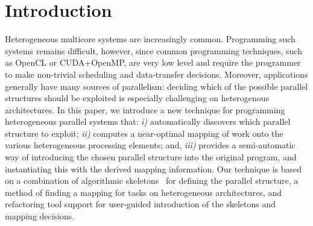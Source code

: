 \documentclass[smallextended]{svjour3}
\begin{document}
\section{Introduction}
\noindent
Heterogeneous multicore systems are increasingly common.
Programming such systems remains difficult, however, since
common programming techniques, such as OpenCL or CUDA+OpenMP,
are very low level and 
require the programmer to make non-trivial scheduling and data-transfer decisions.
Moreover, applications generally have many sources of parallelism: deciding
which of the possible parallel structures should be exploited is especially challenging on heterogenous architectures.
%
In this paper, we introduce a new technique for programming heterogeneous parallel systems
that: \emph{i)} automatically discovers which parallel structure to exploit; \emph{ii)} computes a near-optimal mapping of work onto
the various heterogeneous processing elements; and, \emph{iii)} provides a semi-automatic way of
introducing the chosen parallel structure into the original program, and instantiating this with the derived mapping information.
Our technique is based on a combination of algorithmic skeletons~\cite{cole-th} for defining the parallel structure, %
 a method of finding a mapping for tasks on
 heterogeneous architectures,%
 and refactoring tool support for user-guided introduction of the skeletons and mapping decisions. 
\end{document}
